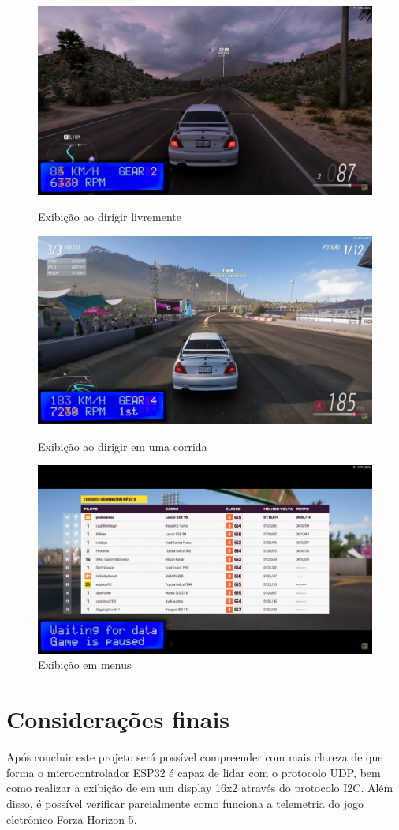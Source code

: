 \documentclass[12pt]{article}
\begin{document}
\begin{figure}[H]
  \centering
  \includegraphics[width=.7\textwidth]{images/real_overworld.png}
  \caption{Exibição ao dirigir livremente}
  \bigskip
  \label{fig:real_overworld}
  \includegraphics[width=.7\textwidth]{images/real_on_race.png}
  \caption{Exibição ao dirigir em uma corrida}
  \bigskip
  \label{fig:real_on_race}
  \includegraphics[width=.7\textwidth]{images/real_menu.png}
  \caption{Exibição em menus}
  \label{fig:real_menu}
\end{figure}

\clearpage

\section{Considerações finais}

Após concluir este projeto será possível compreender com mais clareza de que forma o microcontrolador
ESP32 é capaz de lidar com o protocolo UDP, bem como realizar a exibição de em um display 16x2 através do
protocolo I2C. Além disso, é possível verificar parcialmente como funciona a telemetria do jogo eletrônico
Forza Horizon 5.
\end{document}
